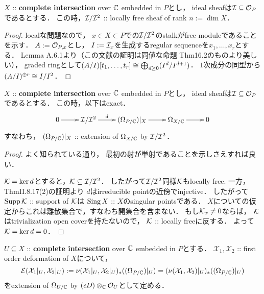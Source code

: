 \documentclass[a4paper]{jsarticle}
\newcommand{\defX}{\mathcal{X}}
\begin{document}
    \subsection{\tp{$\shE(\defX_1, \defX_2)$}{E(X1,X2)}}
    \begin{Lemma}
        $X$ :: \textbf{complete intersection} over $\mathbb{C}$ embedded in $P$とし，
        ideal sheafは$\mathcal{I} \subseteq \mathcal{O}_P$であるとする．
        この時，$\mathcal{I}/\mathcal{I}^2$ :: locally free sheaf of rank $n:=\dim X$．
    \end{Lemma}
    \begin{proof}
        localな問題なので，
        $x \in X \subset P$での$\mathcal{I}/\mathcal{I}^2$のstalkがfree moduleであることを示す．
        $A:=\mathcal{O}_{P, x}$とし，
        $I:=\mathcal{I}_x$を生成するregular sequenceを$x_1, \dots, x_r$とする．
        \cite{IntTh} Lemma A.6.1より（この文献の証明は同値な命題\cite{Mat} Thm16.2のものより美しい），
        graded ringとして$(A/I)[t_1,\dots,t_r] \cong \bigoplus_{d \geq 0}(I^{d}/I^{d+1})$．
        $1$次成分の同型から$(A/I)^{\oplus r} \cong I/I^2$．
    \end{proof}

    \begin{Lemma}
        $X$ :: \textbf{complete intersection} over $\mathbb{C}$ embedded in $P$とし，
        ideal sheafは$\mathcal{I} \subseteq \mathcal{O}_P$であるとする．
        この時，以下はexact．
        \[\xymatrix{
                0 \ar[r]& \shI/\shI^2 \ar[r]^-{d}& (\shDer_{P/\C})|_{X} \ar[r]& \shDer_{X/\C} \ar[r]& 0
        }\]
        すなわち，
        $(\Omega_{P/\mathbb{C}})|_{X}$ :: extension of $\Omega_{X/\mathbb{C}}$ by $\mathcal{I}/\mathcal{I}^2$．
    \end{Lemma}
    \begin{proof}
        よく知られている通り，
        最初の射が単射であることを示しさえすれば良い．
        
        $\mathcal{K}=\ker d$とすると，$\mathcal{K} \subseteq \mathcal{I}/\mathcal{I}^2$．
        したがって$\mathcal{I}/\mathcal{I}^2$同様$\mathcal{K}$もlocally free.
        一方，\cite{HarAG} ThmII.8.17(2)の証明より
        $d$はirreducible pointの近傍でinjective．
        したがって$\operatorname{Supp} \mathcal{K}$ :: support of $\mathcal{K}$は
        $\operatorname{Sing} X$ :: $X$のsingular pointsである．
        $X$についての仮定からこれは離散集合で，すなわち開集合を含まない．
        もし$\mathcal{K}_x \neq 0$ならば，
        $\mathcal{K}$はtrivialization open coverを持たないので，
        $\mathcal{K}$ :: locally freeに反する．
        よって$\mathcal{K}=\ker d=0$．
    \end{proof}

    \begin{Def}
        $U \subseteq X$ :: \textbf{complete intersection} over $\mathbb{C}$ embedded in $P$とする．
        $\defX_1, \defX_2$ :: first order deformation of $X$について，
        \[
            \shE(\defX_1|_U, \defX_2|_U)
            :=\nu(\defX_1|_U, \defX_2|_U)_*((\shDer_{P/\C})|_{U})
            =(\nu(\defX_1, \defX_2)|_U)_*((\shDer_{P/\C})|_{U})
        \]
        をextension of $\Omega_{U/\mathbb{C}}$ by $(\epsilon D) \otimes_{\mathbb{C}} \mathcal{O}_{U}$として定める．
    \end{Def}
\end{document}
